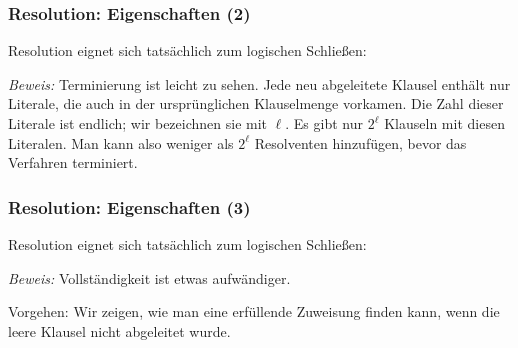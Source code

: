 \documentclass[aspectratio=1610,onlymath]{beamer}
\begin{document}
\begin{frame}[t]\frametitle{Resolution: Eigenschaften (2)}

Resolution eignet sich tatsächlich zum logischen Schließen:\medskip


\emph{Beweis:} \alert{Terminierung} ist leicht zu sehen.\pause{}
Jede neu abgeleitete Klausel enthält nur Literale,
die auch in der ursprünglichen Klauselmenge vorkamen. Die Zahl dieser Literale ist endlich; wir bezeichnen sie mit
$\ell$. Es gibt nur $2^\ell$ Klauseln mit diesen Literalen. Man kann also weniger als $2^\ell$ Resolventen hinzufügen, bevor das Verfahren terminiert.

\end{frame}

\begin{frame}[t]\frametitle{Resolution: Eigenschaften (3)}

Resolution eignet sich tatsächlich zum logischen Schließen:\medskip


\emph{Beweis:} \alert{Vollständigkeit} ist etwas aufwändiger.\medskip

Vorgehen: Wir zeigen, wie
man eine erfüllende Zuweisung finden kann, wenn die leere Klausel nicht abgeleitet wurde.

\end{frame}
\end{document}
